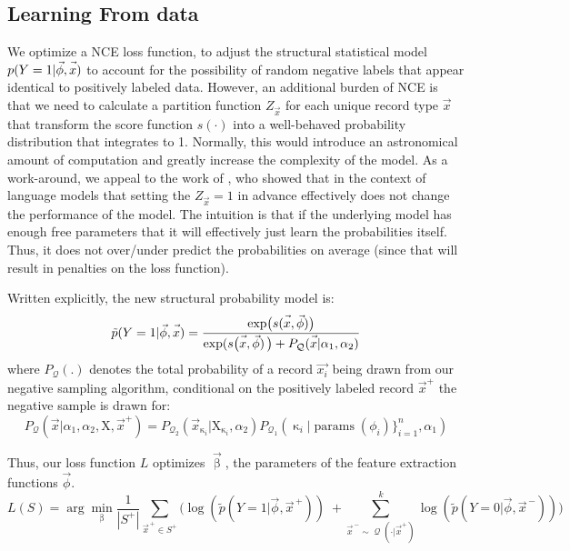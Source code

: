 \documentclass{article} %
\newcommand{\vect}[1]{\vec{#1}}
\DeclareMathOperator{\q}{{\mathcal{Q}}}
\begin{document}
\subsection{Learning From data}
\label{sec:learning}
We optimize a NCE loss function, to adjust the structural statistical model $p(Y=1|\vect{\phi},\vect{x\vphantom{phi}})$ to account for the possibility of random negative labels that appear identical to positively labeled data.
However, an additional burden of NCE is that we need to calculate a partition function $Z_{\vec{x}}$ for each unique record type $\vec{x}$ that transform the score function $s(\cdot)$ into a well-behaved probability distribution that integrates to 1.
Normally, this would introduce an astronomical amount of computation and greatly increase the complexity of the model.
As a work-around, we appeal to the work of \citet{fastnnlang},
who showed that in the context of language models that setting the $Z_{\vec{x}}=1$ in advance effectively does not change the performance of the model.
The intuition is that if the underlying model has enough free parameters that it will effectively just learn the probabilities itself.
Thus, it does not over/under predict the probabilities on average (since that will result in penalties on the loss function).

Written explicitly, the new structural probability model is:
\begin{equation}
\tilde p(Y=1|\vec{\phi},\vec{x\vphantom{phi}}) = \frac{\exp\bigl(s(\vec{x\vphantom{phi}},\vec{\phi}) \bigr)}{\exp( s\bigl(\vec{x\vphantom{phi}},\vec{\phi}) \, \bigr) + P_{\q}(\vec{\vphantom{phi}x}| \alpha_1,\alpha_2)}
\end{equation}
where $P_{\q}(.)$ denotes the total probability of a record $\vec{x_i}$ being drawn from our negative sampling algorithm, conditional on the positively labeled record $\vect{x}^+$ the negative sample is drawn for:
\begin{equation}
P_{\q}(\vec{x}|\alpha_1,\alpha_2,\mathrm{X},\vect{x}^+) = P_{\q_2}(\vec{x}_{\upkappa_i}|\mathrm{X}_{\upkappa_i},\alpha_2) P_{\q_1}(\upkappa_i|\operatorname{params}(\phi_i)\}_{i=1}^n,\alpha_1)
\end{equation}

Thus, our loss function $L$ optimizes $\vect{\upbeta}$, the parameters of the feature extraction functions $\vect\phi$.
\begin{equation}
L(S)  = \arg\min_\upbeta   \frac{1}{|S^+|} \sum_{\vect{x}^{\,+} \in S^+} \Big(\log(\tilde p(Y=1|\vec{\phi},\vect{x}^{\,+}   ) ) \; + \sum_{\vect{x}^{\,-}  \sim \q(\cdot|\vect{x}^+)}^k \log(\tilde p(Y=0|\vec{\phi},\vect{x}^{\,-}  )) \Big)
\end{equation}
\end{document}
